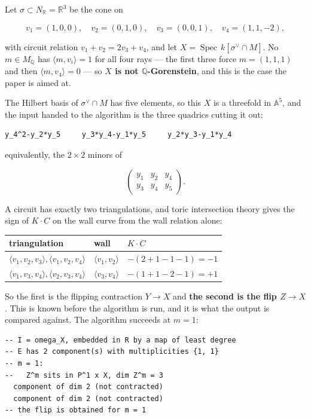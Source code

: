 \documentclass[11pt,reqno]{amsart}
\newcommand{\QQ}{\ensuremath{\mathbb{Q}}}
\newcommand{\RR}{\ensuremath{\mathbb{R}}}
\newcommand{\bbA}{\ensuremath{\mathbb{A}}}
\DeclareMathOperator{\Spec}{Spec}
\theoremstyle{plain}
\theoremstyle{definition}
\begin{document}
Let \(\sigma \subset N_\RR{} = \RR^3\) be the cone on

\[v_1 = (1,0,0), \quad v_2 = (0,1,0), \quad v_3 = (0,0,1), \quad v_4 = (1,1,-2),\]

with circuit relation \(v_1 + v_2 = 2v_3 + v_4\), and let
\(X = \Spec\, k[\sigma^\vee \cap M]\). No \(m \in M_\QQ{}\) has
\(\langle m, v_i\rangle = 1\) for all four rays --- the first three
force \(m = (1,1,1)\) and then \(\langle m, v_4\rangle = 0\) --- so
\textbf{\(X\) is not \QQ{}-Gorenstein}, and this is the case the paper is
aimed at.

The Hilbert basis of \(\sigma^\vee \cap M\) has five elements, so this
\(X\) is a threefold in \(\bbA^5\), and the input handed to the
algorithm is the three quadrics cutting it out:

\begin{verbatim}
y_4^2-y_2*y_5     y_3*y_4-y_1*y_5     y_2*y_3-y_1*y_4
\end{verbatim}

\noindent
equivalently, the \(2 \times 2\) minors of

\[\begin{pmatrix} y_1 & y_2 & y_4 \\ y_3 & y_4 & y_5 \end{pmatrix}.\]

A circuit has exactly two triangulations, and toric intersection theory
gives the sign of \(K \cdot C\) on the wall curve from the wall relation
alone:

\begin{longtable}[]{@{}lll@{}}
\toprule\noalign{}
triangulation & wall & \(K \cdot C\) \\
\midrule\noalign{}
\endhead
\bottomrule\noalign{}
\endlastfoot
\(\langle v_1,v_2,v_3\rangle, \langle v_1,v_2,v_4\rangle\) &
\(\langle v_1,v_2\rangle\) & \(-(2+1-1-1) = -1\) \\
\(\langle v_1,v_3,v_4\rangle, \langle v_2,v_3,v_4\rangle\) &
\(\langle v_3,v_4\rangle\) & \(-(1+1-2-1) = +1\) \\
\end{longtable}

So the first is the flipping contraction \(Y \to X\) and \textbf{the
second is the flip \(Z \to X\)}. This is known before the algorithm is
run, and it is what the output is compared against. The algorithm
succeeds at \(m = 1\):

\begin{verbatim}
-- I = omega_X, embedded in R by a map of least degree
-- E has 2 component(s) with multiplicities {1, 1}
-- m = 1:
--   Z^m sits in P^1 x X, dim Z^m = 3
  component of dim 2 (not contracted)
  component of dim 2 (not contracted)
-- the flip is obtained for m = 1
\end{verbatim}
\end{document}
